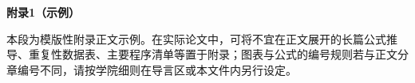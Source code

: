 
\clearpage
{}

{}

{\centering {} \bfseries \heiti 附录1（示例）\par}

\vspace{0.5cm}

 \songti
\setlength{\parindent}{2em}

本段为模版性附录正文示例。在实际论文中，可将不宜在正文展开的长篇公式推导、重复性数据表、主要程序清单等置于附录；图表与公式的编号规则若与正文分章编号不同，请按学院细则在导言区或本文件内另行设定。
